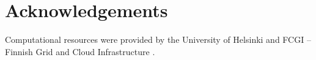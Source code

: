 \chapter{Acknowledgements}

Computational resources were provided by the University of Helsinki and FCGI -- Finnish Grid and Cloud Infrastructure \cite{finnishGridAndCloud}.